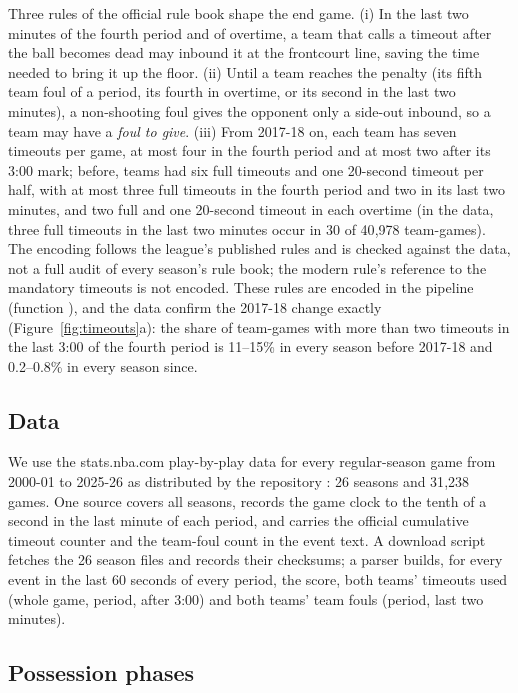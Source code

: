 \documentclass[article]{jdssv}
\begin{document}
Three rules of the official rule book \citep{nbarules} shape the end game. (i) In the last two minutes of the fourth period and of overtime, a team
that calls a timeout after the ball becomes dead may inbound it at the frontcourt line, saving the time
needed to bring it up the floor. (ii) Until a team reaches the penalty (its fifth team foul of a period, its fourth in
overtime, or its second in the last two minutes), a non-shooting foul gives the opponent only a side-out inbound, so a
team may have a \emph{foul to give}. (iii) From 2017-18 on, each team has seven timeouts per game, at most
four in the fourth period and at most two after its 3:00 mark; before, teams had six full timeouts and one
20-second timeout per half, with at most three full timeouts in the fourth period and two in its last two
minutes, and two full and one 20-second timeout in each overtime (in the data, three full timeouts in the
last two minutes occur in 30 of 40{,}978 team-games). The encoding follows the league's published rules and is
checked against the data, not a full audit of every season's rule book; the modern rule's reference to the
mandatory timeouts is not encoded. These rules are encoded in
the pipeline (function ), and the data confirm the 2017-18 change exactly
(Figure~\ref{fig:timeouts}a): the share of team-games with more than two timeouts in the last 3:00 of the
fourth period is 11--15\% in every season before 2017-18 and 0.2--0.8\% in every season since.

\subsection{Data}

We use the stats.nba.com play-by-play data for every regular-season game from 2000-01 to 2025-26 as
distributed by the  repository \citep{nbadata}: 26 seasons and 31{,}238 games. One source
covers all seasons, records the game clock to the tenth of a second in the last minute of each period, and
carries the official cumulative timeout counter and the team-foul count in the event text. A download
script fetches the 26 season files and records their checksums; a parser builds, for every event in the last
60 seconds of every period, the score, both teams' timeouts used (whole game, period, after 3:00) and both
teams' team fouls (period, last two minutes).

\subsection{Possession phases}
\end{document}
